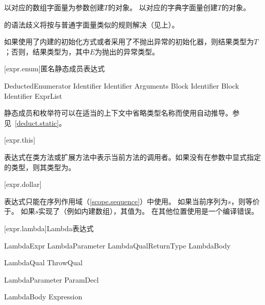 \pnum
{}以对应的数组字面量为参数创建$T$的对象。
以对应的字典字面量创建$T$的对象。

\pnum
{}的语法歧义将按与普通字面量类似的规则解决（见上）。

\pnum
如果使用了内建的初始化方式或者采用了不抛出异常的初始化器，则结果类型为$T$；否则，结果类型为，其中$E$为抛出的异常类型。

[expr.enum]{匿名静态成员表达式}

\begin{bnf}{DeductedEnumerator}
     Identifier \br
     Identifier \terminal{(} Arguments\bnfq \terminal{)} Block\bnfs \br
     Identifier Block \br
     Identifier \terminal{[} ExprList\bnfq \terminal{]}
\end{bnf}

\pnum
静态成员和枚举符可以在适当的上下文中省略类型名称而使用自动推导。参见~\ref{deduct.static}。

[expr.this]{}

\pnum
表达式在类方法或扩展方法中表示当前方法的调用者。如果没有在参数中显式指定的类型，则其类型为。

[expr.dollar]{\tcode{\$}}

\pnum
表达式\tcode{\$}只能在序列作用域（\ref{scope.sequence}）中使用。
如果当前序列为$s$，则\tcode{\$}等价于。
如果$s$实现了（例如内建数组），其值为。
在其他位置使用\tcode{\$}是一个编译错误。

[expr.lambda]{Lambda表达式}

\begin{bnf}{LambdaExpr}
    LambdaParameter LambdaQual\bnfs ReturnType\bnfq \terminal{=>} LambdaBody
\end{bnf}

\begin{bnf}{LambdaQual}
     \br
    ThrowQual
\end{bnf}

\begin{bnf}{LambdaParameter}
    ParamDecl
\end{bnf}

\begin{bnf}{LambdaBody}
    Expression
\end{bnf}

